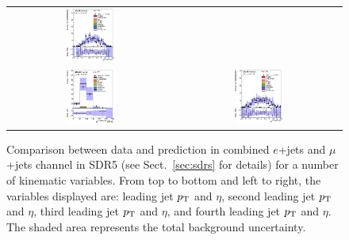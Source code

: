\begin{figure}[htbp]
\begin{center}
\begin{tabular}{cc}
\includegraphics[width=0.30\textwidth]{appendices/figures/sdrs/JetEta3_ELEMUONCR4_1W_NOMINAL.eps} \\
\includegraphics[width=0.30\textwidth]{appendices/figures/sdrs/JetPt4_ELEMUONCR4_1W_NOMINAL.eps}  &
\includegraphics[width=0.30\textwidth]{appendices/figures/sdrs/JetEta4_ELEMUONCR4_1W_NOMINAL.eps}  \\
\end{tabular}\caption{\small {Comparison between data and prediction in combined $e$+jets and $\mu$+jets channel in SDR5 (see Sect.~\ref{sec:sdrs} for details) 
for a number of kinematic variables. From top to bottom and left to right, the variables displayed are: leading jet $\pt$ and $\eta$,  second leading jet $\pt$ and $\eta$,
third leading jet $\pt$ and $\eta$, and fourth leading jet $\pt$ and $\eta$. The shaded area represents the total background uncertainty.}}
\label{fig:ELEMUONCR4_2}
\end{center}
\end{figure}                                                                             

